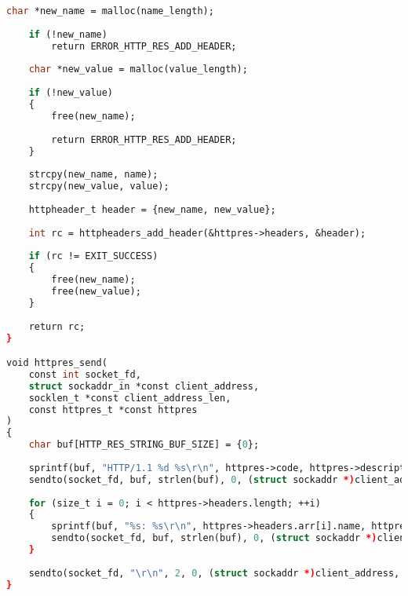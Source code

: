 \begin{lstlisting}[label=httptools_code,caption=Реализация обработчика HTTP-запросов,language=Caml]
	char *new_name = malloc(name_length);
	
	if (!new_name)
		return ERROR_HTTP_RES_ADD_HEADER;
	
	char *new_value = malloc(value_length);
	
	if (!new_value)
	{
		free(new_name);
		
		return ERROR_HTTP_RES_ADD_HEADER;
	}
	
	strcpy(new_name, name);
	strcpy(new_value, value);
	
	httpheader_t header = {new_name, new_value};
	
	int rc = httpheaders_add_header(&httpres->headers, &header);
	
	if (rc != EXIT_SUCCESS)
	{
		free(new_name);
		free(new_value);
	}
	
	return rc;
}

void httpres_send(
	const int socket_fd,
	struct sockaddr_in *const client_address,
	socklen_t *const client_address_len,
	const httpres_t *const httpres
)
{
	char buf[HTTP_RES_STRING_BUF_SIZE] = {0};
	
	sprintf(buf, "HTTP/1.1 %d %s\r\n", httpres->code, httpres->description);
	sendto(socket_fd, buf, strlen(buf), 0, (struct sockaddr *)client_address, *client_address_len);
	
	for (size_t i = 0; i < httpres->headers.length; ++i)
	{
		sprintf(buf, "%s: %s\r\n", httpres->headers.arr[i].name, httpres->headers.arr[i].value);
		sendto(socket_fd, buf, strlen(buf), 0, (struct sockaddr *)client_address, *client_address_len);
	}
	
	sendto(socket_fd, "\r\n", 2, 0, (struct sockaddr *)client_address, *client_address_len);
}
\end{lstlisting}

